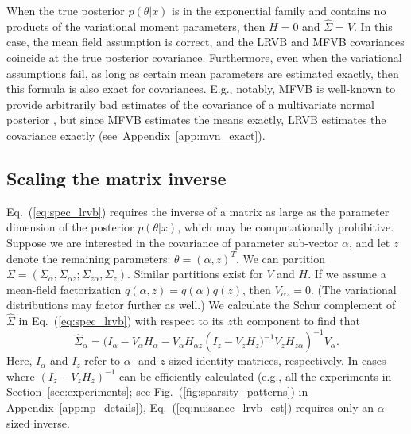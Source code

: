 \documentclass{article}\usepackage[]{graphicx}\usepackage[]{color}
\newcommand{\app}[1]{Appendix~\ref{app:#1}}
\newcommand{\mysec}[1]{Section~\ref{sec:#1}}
\newcommand{\eq}[1]{Eq.~(\ref{eq:#1})}
\newcommand{\fig}[1]{Fig.~(\ref{fig:#1})}
\newcommand{\truecov}{\Sigma} %
\newcommand{\lrcov}{\hat{\Sigma}} %
\newcommand{\vbcov}{V} %
\begin{document}
When the true posterior $p(\theta | x)$ is in the exponential family and
contains no products of the variational moment parameters, then $H=0$ and
$\lrcov=\vbcov$. In this case, the mean field assumption is correct, and the
LRVB and MFVB covariances coincide at the true posterior covariance.
Furthermore, even when the variational assumptions fail, as long as certain mean
parameters are estimated exactly, then this formula is also exact for
covariances. E.g., notably, MFVB is well-known to provide arbitrarily bad
estimates of the covariance of a multivariate normal posterior
\citep{mackay:2003:information,wang:2005:inadequacy,bishop:2006:pattern,turner:2011:two},
but since MFVB estimates the means exactly, LRVB estimates the covariance exactly
(see~\app{mvn_exact}).

\subsection{Scaling the matrix inverse} \label{sec:scaling_formulas}

\eq{spec_lrvb} requires the inverse of a matrix as large
as the parameter dimension of the posterior $p(\theta | x)$,
which may be computationally prohibitive.
Suppose we are interested in the covariance of parameter sub-vector $\alpha$,
and let $z$ denote the remaining parameters: $\theta = \left( \alpha, z \right)^{T}$.
We can partition
%
$
\truecov = \left( \truecov_{\alpha}, \truecov_{\alpha z}; \truecov_{z\alpha}, \truecov_{z} \right).
$
%
Similar partitions exist for $\vbcov$ and $H$.
If we assume a mean-field factorization $q(\alpha,z) = q(\alpha)q(z)$, then
$\vbcov_{\alpha z} = 0$. (The variational
distributions may factor further as well.)
We calculate the Schur complement of $\lrcov$ in \eq{spec_lrvb}
with respect to its $z$th
component to find that %
%
\begin{equation} \label{eq:nuisance_lrvb_est}
\hat{\truecov}_{\alpha} =
 ( I_{\alpha} - V_{\alpha}H_{\alpha} -
  V_{\alpha}H_{\alpha z} \left(I_{z} - V_{z}H_{z})^{-1}
  V_{z}H_{z\alpha}\right)^{-1} V_{\alpha}.
\end{equation}
Here, $I_\alpha$ and $I_z$ refer to $\alpha$- and $z$-sized identity
matrices, respectively.  In cases where
$\left(I_{z} - V_{z}H_{z}\right)^{-1}$
can be efficiently calculated (e.g., all the experiments
in \mysec{experiments}; see \fig{sparsity_patterns} in \app{np_details}),
\eq{nuisance_lrvb_est}
requires only an $\alpha$-sized inverse.
\end{document}
